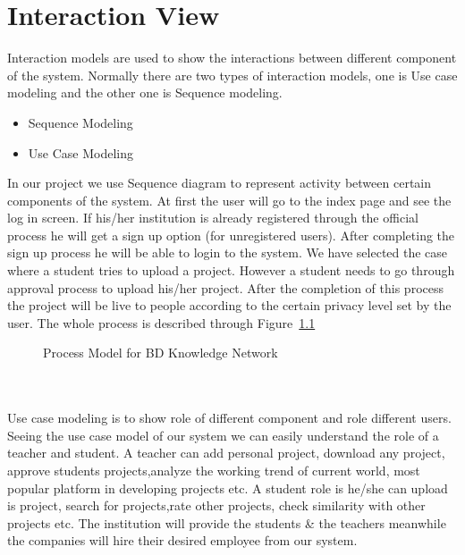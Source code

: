 \documentclass{scrreprt}
\begin{document}
\chapter{Interaction View}
Interaction models are used to show the interactions between different component of the system.
Normally there are two types of interaction models, one is Use case modeling and the other one is Sequence modeling.
\begin{itemize}
\item Sequence Modeling
\item Use Case Modeling
\end{itemize}
In our project we use Sequence diagram to represent activity between certain components of the system. At first the user will go to the index page and see the log in screen. If his/her institution is already registered through the official process he will get a sign up option (for unregistered users). After completing the sign up process he will be able to login to the system. We have selected the case where a student tries to upload a project. However a student needs to go through  approval process to upload his/her project. After the completion of this process the project will be live to people according to the certain privacy level set by the user.
The whole process is described through Figure~\ref{PM}
\begin{figure}
\begin{center}
\end{center} 
\caption{Process Model for BD Knowledge Network\label{PM}}
\end{figure}
\\\\Use case modeling is to show role of different component and role  different users. Seeing the use case model of our system we can easily understand the role of a teacher and student. A teacher can add personal project, download any project, approve students projects,analyze the working trend of current world, most popular platform in developing projects etc. A student role is he/she can upload is project, search for projects,rate other projects, check similarity with other projects etc. The institution will provide the students \& the teachers meanwhile the companies will hire their desired employee from our system.
\end{document}
